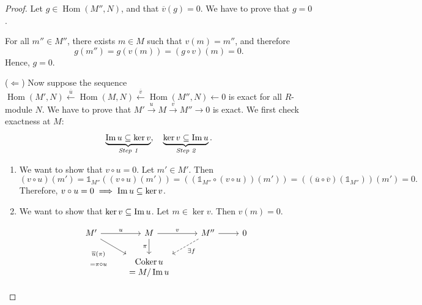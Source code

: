 \begin{proof}
    Let \( g \in \operatorname{Hom}(M'', N) \), and that  \( \overline{v}(g) = 0 \). We have to prove that \( g = 0 \).

    For all \( m'' \in M'' \), there exists \( m \in M \) such that  \( v(m) = m'' \), and therefore
     \[
        g(m'') = g(v(m)) = (g \circ v)(m) = 0.
    \]
    Hence, \( g = 0 \).
    
    (\( \Longleftarrow \)) Now suppose the sequence \( \operatorname{Hom}(M', N) \xleftarrow{\overline{u}} \operatorname{Hom}(M, N) \xleftarrow{\overline{v}} \operatorname{Hom}(M'', N) \leftarrow 0 \) is exact for all \( R \)-module  \( N \). We have to prove that \( M' \xrightarrow{u} M \xrightarrow{v} M'' \rightarrow 0\) is exact. 
    We first check exactness at \( M \):
    \[
        \underbrace{\operatorname{Im} u \subseteq \ker v}_{\emph{Step 1}}, \quad \underbrace{\ker v \subseteq \operatorname{Im} u}_{\emph{Step 2}}.
    \]
    \begin{enumerate}[label=\emph{Step \arabic*}. , leftmargin=*]
        \item We want to show that \( v \circ u =0 \). Let  \( m' \in M'\). Then
         \[
             (v \circ u)(m') = \mathds{1}_{M''}((v\circ u)(m')) = ((\mathds{1}_{M''}\circ(v \circ u))(m')) = ((\overline{u} \circ \overline{v})(\mathds{1}_{M''}))(m') = 0.
        \]
        Therefore, \( v \circ u = 0 \implies \operatorname{Im} u \subseteq \ker v\).
    \item We want to show that \( \ker v \subseteq \operatorname{Im} u \). Let \( m \in \ker v \). Then  \( v(m) = 0 \).

\[\begin{tikzcd}
	{M'} & M & {M''} & 0 \\
	& \begin{array}{c} \operatorname{Coker} u\\=M/\operatorname{Im}u \end{array}
	\arrow["u", from=1-1, to=1-2]
	\arrow["\begin{array}{c} \overline{u}(\pi) \\= \pi\circ u \end{array}"', from=1-1, to=2-2]
	\arrow["v", from=1-2, to=1-3]
	\arrow["\pi"', from=1-2, to=2-2]
	\arrow[from=1-3, to=1-4]
	\arrow["{\exists f}", dashed, from=1-3, to=2-2]
\end{tikzcd}\]


\end{enumerate}
\end{proof}
